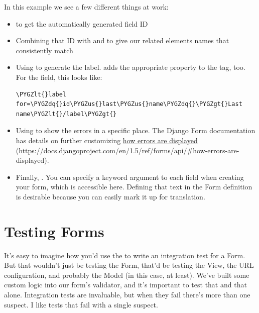 \documentclass[letterpaper,10pt,english]{sphinxmanual}
\def\PYGZus{\char`\_}
\def\PYGZlt{\char`\<}
\def\PYGZgt{\char`\>}
\def\PYGZdq{\char`\"}
\begin{document}
In this example we see a few different things at work:
\begin{itemize}
\item {} 
 to get the automatically generated field ID

\item {} 
Combining that ID with  and  to give our
related elements names that consistently match

\item {} 
Using  to generate the label.  adds
the appropriate  property to the tag, too. For the
 field, this looks like:

\begin{Verbatim}[commandchars=\\\{\}]
\PYGZlt{}label for=\PYGZdq{}id\PYGZus{}last\PYGZus{}name\PYGZdq{}\PYGZgt{}Last name\PYGZlt{}/label\PYGZgt{}
\end{Verbatim}

\item {} 
Using  to show the errors in a specific place. The
Django Form documentation has details on further customizing \href{https://docs.djangoproject.com/en/1.5/ref/forms/api/\#how-errors-are-displayed}{how
errors are displayed} (https://docs.djangoproject.com/en/1.5/ref/forms/api/\#how-errors-are-displayed).

\item {} 
Finally, . You can specify a 
keyword argument to each field when creating your form, which is
accessible here. Defining that text in the Form definition is
desirable because you can easily mark it up for translation.

\end{itemize}


\section{Testing Forms}
\label{tutorial/forms:testing-forms}
It's easy to imagine how you'd use the  to write
an integration test for a Form. But that wouldn't just be testing the
Form, that'd be testing the View, the URL configuration, and probably
the Model (in this case, at least). We've built some custom logic into
our form's validator, and it's important to test that and that alone.
Integration tests are invaluable, but when they fail there's more than
one suspect. I like tests that fail with a single suspect.
\end{document}
